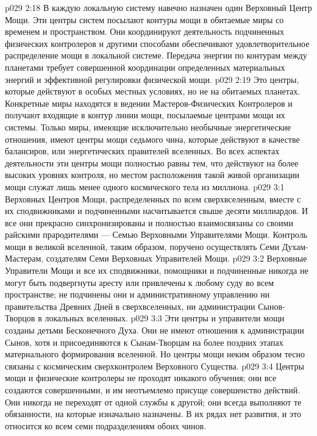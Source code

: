 \vs p029 2:18 \pc {}\bibnobreakspace {} В каждую локальную систему навечно назначен один Верховный Центр Мощи. Эти центры систем посылают контуры мощи в обитаемые миры со временем и пространством. Они координируют деятельность подчиненных физических контролеров и другими способами обеспечивают удовлетворительное распределение мощи в локальной системе. Передача энергии по контурам между планетами требует совершенной координации определенных материальных энергий и эффективной регулировки физической мощи.
\vs p029 2:19 \pc {}\bibnobreakspace {} Это центры, которые действуют в особых местных условиях, но не на обитаемых планетах. Конкретные миры находятся в ведении Мастеров\hyp{}Физических Контролеров и получают входящие в контур линии мощи, посылаемые центрами мощи их системы. Только миры, имеющие исключительно необычные энергетические отношения, имеют центры мощи седьмого чина, которые действуют в качестве балансиров, или энергетических правителей вселенных. Во всех аспектах деятельности эти центры мощи полностью равны тем, что действуют на более высоких уровнях контроля, но местом расположения такой живой организации мощи служат лишь менее одного космического тела из миллиона.
\vs p029 3:1 Верховных Центров Мощи, распределенных по всем сверхвселенным, вместе с их сподвижниками и подчиненными насчитывается свыше десяти миллиардов. И все они прекрасно синхронизированы и полностью взаимосвязаны со своими райскими прародителями --- Семью Верховными Управителями Мощи. Контроль мощи в великой вселенной, таким образом, поручено осуществлять Семи Духам\hyp{}Мастерам, создателям Семи Верховных Управителей Мощи.
\vs p029 3:2 Верховные Управители Мощи и все их сподвижники, помощники и подчиненные никогда не могут быть подвергнуты аресту или привлечены к любому суду во всем пространстве; не подчинены они и административному управлению ни правительства Древних Дней в сверхвселенных, ни администрации Сынов\hyp{}Творцов в локальных вселенных.
\vs p029 3:3 Эти центры и управители мощи созданы детьми Бесконечного Духа. Они не имеют отношения к администрации Сынов, хотя и присоединяются к Сынам\hyp{}Творцам на более поздних этапах материального формирования вселенной. Но центры мощи неким образом тесно связаны с космическим сверхконтролем Верховного Существа.
\vs p029 3:4 \pc Центры мощи и физические контролеры не проходят никакого обучения; они все создаются совершенными, и им неотъемлемо присуще совершенство действий. Они никогда не переходят от одной службы к другой; они всегда выполняют те обязанности, на которые изначально назначены. В их рядах нет развития, и это относится ко всем семи подразделениям обоих чинов.
